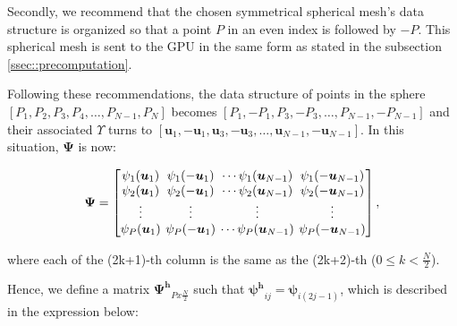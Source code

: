 \documentclass[twoside,twocolumn,10pt]{article}
\begin{document}
Secondly, we recommend that the chosen symmetrical spherical mesh's data structure is organized so that a point $P$ in an even index is followed by $-P$. This spherical mesh is sent to the GPU in the same form as stated in the subsection \ref{ssec::precomputation}.


Following these recommendations, the data structure of points in the sphere $[P_1, P_2, P_3, P_4, \dots, P_{N-1}, P_N]$ becomes $[P_1, -P_1, P_3, -P_3, \dots, P_{N-1}, -P_{N-1}]$ and their associated $\Upsilon$ turns to $[\bm{u}_1, -\bm{u}_1, \bm{u}_3, -\bm{u}_3, \dots, \bm{u}_{N-1}, -\bm{u}_{N-1}]$. In this situation, $\bm{\Psi}$ is now:

\begin{equation*}
\bm{\Psi} = 
\begingroup %
\setlength\arraycolsep{2pt}
\begin{bmatrix} 
    \psi_1(\bm{u}_1) & \psi_1(-\bm{u}_1) & \cdots \psi_1(\bm{u}_{N-1}) & \psi_1(-\bm{u}_{N-1})  \\
    
     \psi_2(\bm{u}_1)& \psi_2(-\bm{u}_1) & \cdots \psi_2(\bm{u}_{N-1}) & \psi_2(-\bm{u}_{N-1}) \\

    \vdots & \vdots & \vdots & \vdots  \\
    
     \psi_P(\bm{u}_1)&\psi_P(-\bm{u}_1) & \cdots \psi_P(\bm{u}_{N-1}) & \psi_P(-\bm{u}_{N-1})
    
\end{bmatrix},
\endgroup
\end{equation*}

where each of the (2k+1)-th column is the same as the (2k+2)-th ($0 \leq k < \frac{N}{2}$).

Hence, we define a matrix $\bm{\Psi^h}_{Px\frac{N}{2}}$ such that $\bm{\psi^h}_{ij} = \bm{\psi}_{i(2j-1)}$, which is described in the expression below:

\end{document}
